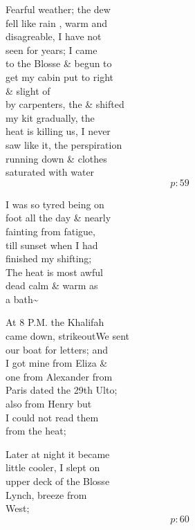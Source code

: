 \documentclass{report}
\begin{document}
	\par{
 	Fearful weather; the dew\ \\fell like rain , warm and\ \\disagreable, I have not\ \\seen for years; I came\ \\to the Blosse \& begun to\ \\get my cabin put to right\ \\\& slight of\ \\by carpenters, the \& shifted\ \\my kit gradually, the\ \\heat is killing us, I never\ \\saw like it, the perspiration\ \\running down \& clothes\ \\saturated with water\ \\
  \[p: 59 \]

	}


	\par{
 	I was so tyred being on\ \\foot all the day \& nearly\ \\fainting from fatigue,\ \\till sunset when I had\ \\finished my shifting;\ \\The heat is most awful\ \\dead calm \& warm as\ \\a bath\~{}\ \\
	}

	\par{
 	At 8 P.M. the Khalifah\ \\came down, \lbrack strikeout\rbrack We sent\ \\our boat for letters; and\ \\I got mine from Eliza \&\ \\one from Alexander from\ \\Paris dated the 29th Ulto;\ \\also from Henry but\ \\I could not read them\ \\from the heat;\ \\
	}

	\par{
 	Later at night it became\ \\little cooler, I slept on\ \\upper deck of the Blosse\ \\Lynch, breeze from\ \\West;\ \\
  \[p: 60 \]

	}
\end{document}
